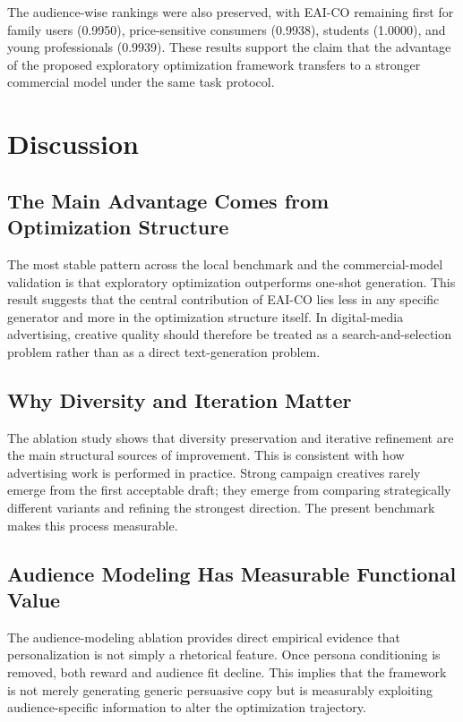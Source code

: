 The audience-wise rankings were also preserved, with EAI-CO remaining first for family users (0.9950), price-sensitive consumers (0.9938), students (1.0000), and young professionals (0.9939). These results support the claim that the advantage of the proposed exploratory optimization framework transfers to a stronger commercial model under the same task protocol.

\section{Discussion}

\subsection{The Main Advantage Comes from Optimization Structure}

The most stable pattern across the local benchmark and the commercial-model validation is that exploratory optimization outperforms one-shot generation. This result suggests that the central contribution of EAI-CO lies less in any specific generator and more in the optimization structure itself. In digital-media advertising, creative quality should therefore be treated as a search-and-selection problem rather than as a direct text-generation problem.

\subsection{Why Diversity and Iteration Matter}

The ablation study shows that diversity preservation and iterative refinement are the main structural sources of improvement. This is consistent with how advertising work is performed in practice. Strong campaign creatives rarely emerge from the first acceptable draft; they emerge from comparing strategically different variants and refining the strongest direction. The present benchmark makes this process measurable.

\subsection{Audience Modeling Has Measurable Functional Value}

The audience-modeling ablation provides direct empirical evidence that personalization is not simply a rhetorical feature. Once persona conditioning is removed, both reward and audience fit decline. This implies that the framework is not merely generating generic persuasive copy but is measurably exploiting audience-specific information to alter the optimization trajectory.

